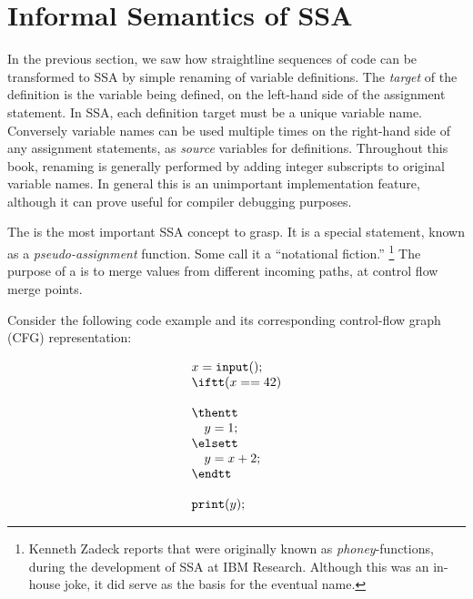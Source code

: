 


\section{Informal Semantics of SSA}
In the previous section, we saw how straightline sequences of code can be transformed to SSA by simple renaming of variable definitions. 
The \textit{target} of the definition is the variable being defined, on the left-hand side of the assignment statement. 
In SSA, each definition target must be a unique variable name. 
Conversely variable names can be used multiple times on the right-hand side of any assignment statements, as \textit{source} variables for definitions. 
Throughout this book, renaming is generally performed by adding integer subscripts to original variable names. 
In general this is an unimportant implementation feature, although it can prove useful for compiler debugging purposes.

The \phifun\index{\phifun} is the most important SSA concept to grasp. 
It is a special statement, known as a \textit{pseudo-assignment} function. 
Some call it a ``notational fiction.''
\footnote{ Kenneth Zadeck reports that \phifuns were originally known as \textit{phoney}-functions, during the development of SSA at IBM Research. 
Although this was an in-house joke, it did serve as the basis for the eventual name. 
} The purpose of a \phifun{} is to merge values from different incoming paths, at control flow merge points.

Consider the following code example and its corresponding control-flow graph (CFG) representation:
\smallskip

\begin{minipage}{0.35\textwidth}%
\begin{equation*}
\begin{array}{l}
x = \texttt{input}();\\
\iftt (x == 42)\\
\\
\thentt\\
\quad    y = 1;\\
\elsett\\
\quad    y = x+2;\\
\endtt\\
\\
\texttt{print}(y);%
\end{array}%
\end{equation*}%
\end{minipage}
\begin{minipage}{0.5\textwidth}%
\strut
\end{minipage}
\bigskip



